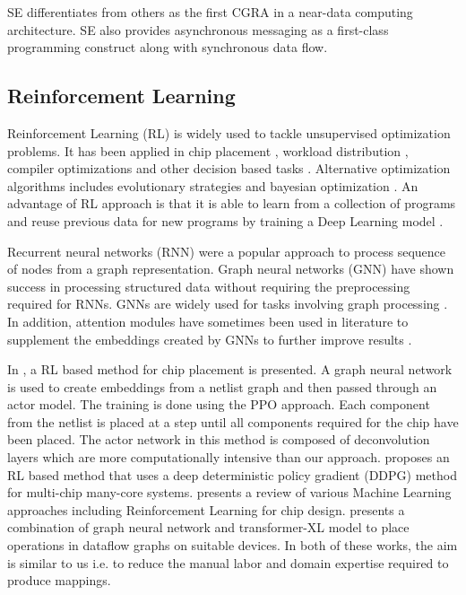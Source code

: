 SE differentiates from others as the first CGRA in a near-data computing architecture.
SE also provides asynchronous messaging as a first-class programming construct along with synchronous data flow. 


\subsection{Reinforcement Learning}
Reinforcement Learning (RL) is widely used to tackle unsupervised optimization problems.
It has been applied in chip placement \cite{mirhoseini2020chip}, workload distribution \cite{Mirhoseini_placementRNN, addanki2019placeto, zhou2019gdp}, compiler optimizations \cite{Zhou_compileGNN} and other decision based tasks \cite{kormushev2013reinforcement, ZophL16_NASRL}. 
Alternative optimization algorithms includes evolutionary strategies \cite{Zhichao_ESNAS} and bayesian optimization \cite{shi2020learned}. 
An advantage of RL approach is that it is able to learn from a collection of programs and reuse previous data for new programs by training a Deep Learning model \cite{zhou2019gdp}.

Recurrent neural networks (RNN) \cite{hochreiter1996lstm} were a popular approach to process sequence of nodes from a graph representation. 
Graph neural networks (GNN) \cite{gori2005new} have shown success in processing structured data without requiring the preprocessing required for RNNs.
GNNs are widely used for tasks involving graph processing \cite{Zhou_compileGNN, zhou2019gdp}. 
In addition, attention modules have sometimes been used in literature to supplement the embeddings created by GNNs to further improve results \cite{addanki2019placeto}.

In \cite{mirhoseini2020chip}, a RL based method for chip placement is presented.
A graph neural network is used to create embeddings from a netlist graph and then passed through an actor model.
The training is done using the PPO approach.
Each component from the netlist is placed at a step until all components required for the chip have been placed.
The actor network in this method is composed of deconvolution layers which are more computationally intensive than our approach. 
\cite{wu_core_2020} proposes an RL based method that uses a deep deterministic policy gradient (DDPG) method for multi-chip many-core systems.
\cite{khailany_accelerating_2020} presents a review of various Machine Learning approaches including Reinforcement Learning for chip design.
\cite{zhou2019gdp} presents a combination of graph neural network and transformer-XL model to place operations in dataflow graphs on suitable devices.
In both of these works, the aim is similar to us i.e. to reduce the manual labor and domain expertise required to produce mappings.

